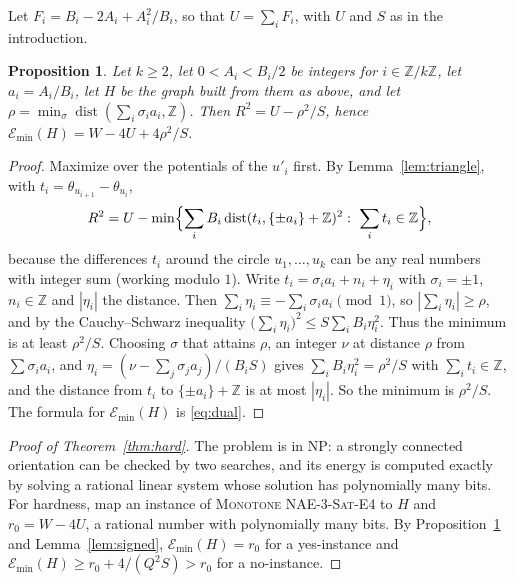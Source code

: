 \documentclass[11pt]{amsart}
\newtheorem{prop}[thm]{Proposition}
\theoremstyle{definition}
\theoremstyle{remark}
\numberwithin{equation}{section}
\DeclareMathOperator{\dist}{dist}
\newcommand{\Emin}{\mathcal E_{\min}}
\newcommand{\Z}{\mathbb Z}
\begin{document}
Let $F_i=B_i-2A_i+A_i^2/B_i$, so that $U=\sum_iF_i$, with $U$ and $S$ as in the introduction.

\begin{prop}\label{prop:ring}
Let $k\ge2$, let $0<A_i<B_i/2$ be integers for $i\in\Z/k\Z$, let $a_i=A_i/B_i$, let $H$ be the graph built from them as above, and let $\rho=\min_{\sigma}\dist(\sum_i\sigma_ia_i,\Z)$. Then $R^2=U-\rho^2/S$, hence $\Emin(H)=W-4U+4\rho^2/S$.
\end{prop}

\begin{proof}
Maximize over the potentials of the $u'_i$ first. By Lemma~\ref{lem:triangle}, with $t_i=\theta_{u_{i+1}}-\theta_{u_i}$,
\[
R^2=U-\min\Bigl\{\sum_iB_i\dist(t_i,\{\pm a_i\}+\Z)^2:\ \sum_it_i\in\Z\Bigr\},
\]
because the differences $t_i$ around the circle $u_1,\dots,u_k$ can be any real numbers with integer sum (working modulo $1$). Write $t_i=\sigma_ia_i+n_i+\eta_i$ with $\sigma_i=\pm1$, $n_i\in\Z$ and $|\eta_i|$ the distance. Then $\sum_i\eta_i\equiv-\sum_i\sigma_ia_i\pmod1$, so $|\sum_i\eta_i|\ge \rho$, and by the Cauchy--Schwarz inequality $\bigl(\sum_i\eta_i\bigr)^2\le S\sum_iB_i\eta_i^2$. Thus the minimum is at least $\rho^2/S$. Choosing $\sigma$ that attains $\rho$, an integer $\nu$ at distance $\rho$ from $\sum\sigma_ia_i$, and $\eta_i=(\nu-\sum_j\sigma_ja_j)/(B_iS)$ gives $\sum_iB_i\eta_i^2=\rho^2/S$ with $\sum_it_i\in\Z$, and the distance from $t_i$ to $\{\pm a_i\}+\Z$ is at most $|\eta_i|$. So the minimum is $\rho^2/S$. The formula for $\Emin(H)$ is \eqref{eq:dual}.
\end{proof}

\begin{proof}[Proof of Theorem~\ref{thm:hard}]
The problem is in NP: a strongly connected orientation can be checked by two searches, and its energy is computed exactly by solving a rational linear system whose solution has polynomially many bits. For hardness, map an instance of \textsc{Monotone NAE-3-Sat-E4} to $H$ and $r_0=W-4U$, a rational number with polynomially many bits. By Proposition~\ref{prop:ring} and Lemma~\ref{lem:signed}, $\Emin(H)=r_0$ for a yes-instance and $\Emin(H)\ge r_0+4/(Q^2S)>r_0$ for a no-instance.
\end{proof}
\end{document}
